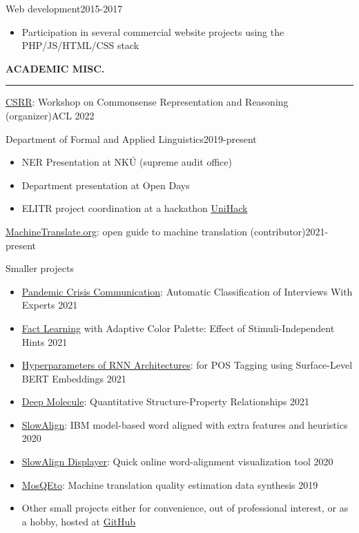 \documentclass[11pt,a4paper]{article} %
\newcommand{\hSection}[1]{
    \medskip
    \MakeUppercase{\bf #1}
    \medskip
    \hrule
}
\newcommand{\hSubsectionC}[2]{
    {#1}\hfill {\footnotesize #2}\hspace{-1cm}\\
    \vspace{-0.5cm}
}
\newcommand{\hSubsectionItemize}[3]{
    {#1}\hfill {\footnotesize #2}\hspace{-1cm}\\
    \vspace{-0.5cm}
    \begin{itemize} \footnotesize #3 \end{itemize}
    \vspace{0.3\baselineskip}
}
\begin{document}
\hSubsectionItemize
{Web development}
{2015-2017}
{
\item Participation in several commercial website projects using the PHP/JS/HTML/CSS stack
}


\hSection{Academic Misc.}

\hSubsectionC
{\href{https://csrr-workshop.github.io/}{CSRR}: Workshop on Commonsense Representation and Reasoning (organizer)}
{ACL 2022}


\hSubsectionItemize
{Department of Formal and Applied Linguistics}
{2019-present}
{
\item NER Presentation at NKÚ (supreme audit office)
\item Department presentation at Open Days
\item ELITR project coordination at a hackathon \href{https://elitr.eu/unihack-2020/}{UniHack}
}

\hSubsectionC
{\href{https://www.machinetranslate.org}{MachineTranslate.org}: open guide to machine translation (contributor)}
{2021-present}

\hSubsectionItemize
{Smaller projects}
{}
{
\item \href{https://github.com/zouharvi/multichannel-management}{Pandemic Crisis Communication}: Automatic Classification of Interviews With Experts \hfill {2021}
\item \href{https://github.com/zouharvi/user-models}{Fact Learning} with Adaptive Color Palette: Effect of Stimuli-Independent Hints \hfill {2021}
\item \href{https://github.com/zouharvi/rnn-bert-pos}{Hyperparameters of RNN Architectures}: for POS Tagging using Surface-Level BERT Embeddings \hfill {2021}
\item \href{https://github.com/zouharvi/deep-molecule-qspr}{Deep Molecule}: Quantitative Structure-Property Relationships \hfill {2021}
\item \href{https://github.com/zouharvi/SlowAlign}{SlowAlign}: 
IBM model-based word aligned with extra features and heuristics \hfill{2020}
\item \href{https://vilda.net/s/slowalign/}{SlowAlign Displayer}: Quick online word-alignment visualization tool \hfill {2020}
\item \href{https://github.com/zouharvi/MosQEto}{MosQEto}: Machine translation quality estimation data synthesis \hfill {2019}
\item Other small projects either for convenience, out of professional interest, or as a hobby, hosted at \href{https://github.com/zouharvi}{GitHub}
}
\end{document}
